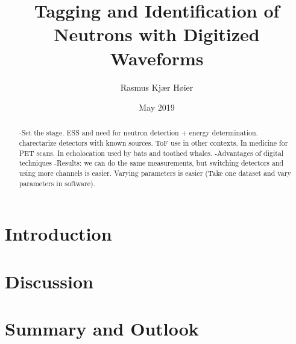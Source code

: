 \documentclass[12pt]{article}
\title{Tagging and Identification of Neutrons with Digitized Waveforms}
\author{Rasmus Kjær Høier}
\date{May 2019}
\begin{document}
\maketitle

\newpage
\setcounter{tocdepth}{2}
\tableofcontents

\newpage
\begin{abstract}
-Set the stage. ESS and need for neutron detection + energy determination. charectarize detectors with known sources. ToF use in other contexts. In medicine for PET scans. In echolocation used by bats and toothed whales.
-Advantages of digital techniques
-Results: we can do the same measurements, but switching detectors and using more channels is easier. Varying parameters is easier (Take one dataset and vary parameters in software).\cite{Leo}
\end{abstract}

\newpage
\onehalfspacing
{}
\setcounter{page}{1}
\section{Introduction}
\clearpage
\clearpage
\clearpage
\clearpage
\clearpage
\clearpage
\clearpage
\section{Discussion}%
\clearpage
\section{Summary and Outlook}%
\clearpage

\end{document}
